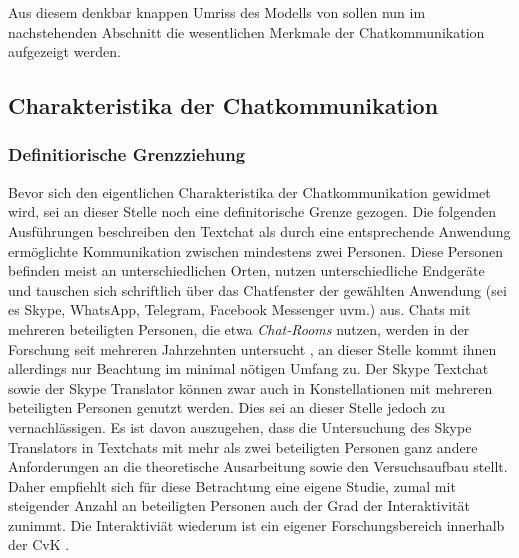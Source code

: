 Aus diesem denkbar knappen Umriss des Modells von \citeauthor{koch_gesprochene_2011} sollen nun im nachstehenden Abschnitt die wesentlichen Merkmale der Chatkommunikation aufgezeigt werden.

%

\subsection{Charakteristika der Chatkommunikation}
\label{K2:subsec:characteristika-chat}

\subsubsection{Definitiorische Grenzziehung}
Bevor sich den eigentlichen Charakteristika der Chatkommunikation gewidmet wird, sei an dieser Stelle noch eine definitorische Grenze gezogen. Die folgenden Ausführungen beschreiben den Textchat als durch eine entsprechende Anwendung ermöglichte Kommunikation zwischen mindestens zwei Personen. Diese Personen befinden meist an unterschiedlichen Orten, nutzen unterschiedliche Endgeräte und tauschen sich schriftlich über das Chatfenster der gewählten Anwendung (sei es Skype, WhatsApp, Telegram, Facebook Messenger uvm.) aus. Chats mit mehreren beteiligten Personen, die etwa \emph{Chat-Rooms} nutzen, werden in der Forschung seit mehreren Jahrzehnten untersucht \citep[vgl. z.\,B.][]{beiswenger_eyetracking_2017, schweiger_handbuch_2019}, an dieser Stelle kommt ihnen allerdings nur Beachtung im minimal nötigen Umfang zu. Der Skype Textchat sowie der Skype Translator können zwar auch in Konstellationen mit mehreren beteiligten Personen genutzt werden. Dies sei an dieser Stelle jedoch zu vernachlässigen. Es ist davon auszugehen, dass die Untersuchung des Skype Translators in Textchats mit mehr als zwei beteiligten Personen ganz andere Anforderungen an die theoretische Ausarbeitung sowie den Versuchsaufbau stellt. Daher empfiehlt sich für diese Betrachtung eine eigene Studie, zumal mit steigender Anzahl an beteiligten Personen auch der Grad der Interaktivität zunimmt. Die Interaktiviät wiederum ist ein eigener Forschungsbereich innerhalb der CvK \citep[vgl. hierzu bsp.][]{beiswenger_eyetracking_2017, durscheid_personale_2018}.





